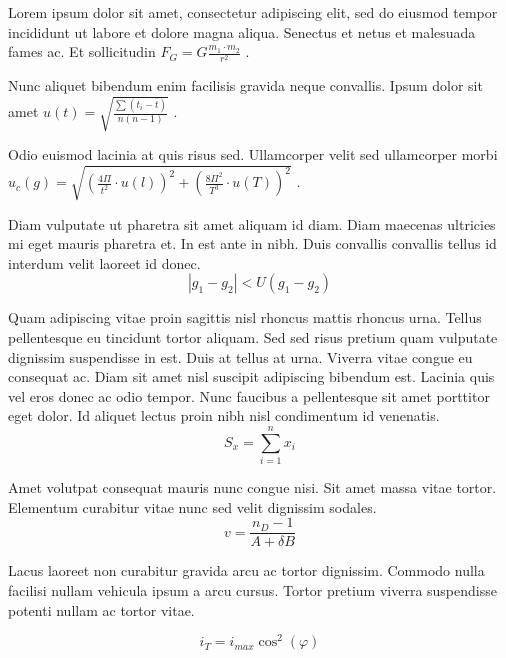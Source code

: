 \documentclass{article}
\begin{document}
Lorem ipsum dolor sit amet, consectetur adipiscing elit, sed do eiusmod tempor incididunt ut labore et dolore magna aliqua. Senectus et netus et malesuada fames ac. Et sollicitudin 
\begin{math}
	F_{G}=G\frac{m_1\cdot m_2}{r^2}
\end{math}
.\newline
 
Nunc aliquet bibendum enim facilisis gravida neque convallis. Ipsum dolor sit amet 
$ u(t)=\sqrt{\frac{\sum(t_i-\overline{t})}{n(n-1)}} $
.\newline
    
Odio euismod lacinia at quis risus sed. Ullamcorper velit sed ullamcorper morbi
\( u_c(g)=\sqrt{(\frac{4\Pi}{t^2}\cdot u(l))^2+(\frac{8\Pi^2}{T^3}\cdot u(T))^2} \)
.\newline

Diam vulputate ut pharetra sit amet aliquam id diam. Diam maecenas ultricies mi eget mauris pharetra et. In est ante in nibh. Duis convallis convallis tellus id interdum velit laoreet id donec. 
\[ |g_1-g_2|<U(g_1-g_2) \]

Quam adipiscing vitae proin sagittis nisl rhoncus mattis rhoncus urna. Tellus pellentesque eu tincidunt tortor aliquam. Sed sed risus pretium quam vulputate dignissim suspendisse in est. Duis at tellus at urna. Viverra vitae congue eu consequat ac. Diam sit amet nisl suscipit adipiscing bibendum est. Lacinia quis vel eros donec ac odio tempor. Nunc faucibus a pellentesque sit amet porttitor eget dolor. Id aliquet lectus proin nibh nisl condimentum id venenatis.
$$ S_x=\sum_{i=1}^{n}x_i $$

Amet volutpat consequat mauris nunc congue nisi. Sit amet massa vitae tortor. Elementum curabitur vitae nunc sed velit dignissim sodales. 
\begin{displaymath}
	v=\frac{n_D-1}{A+\delta B}
\end{displaymath}

Lacus laoreet non curabitur gravida arcu ac tortor dignissim. Commodo nulla facilisi nullam vehicula ipsum a arcu cursus. Tortor pretium viverra suspendisse potenti nullam ac tortor vitae. 

\begin{equation}
	i_T=i_{max}\cos ^2(\varphi)
\end{equation}
\end{document}
